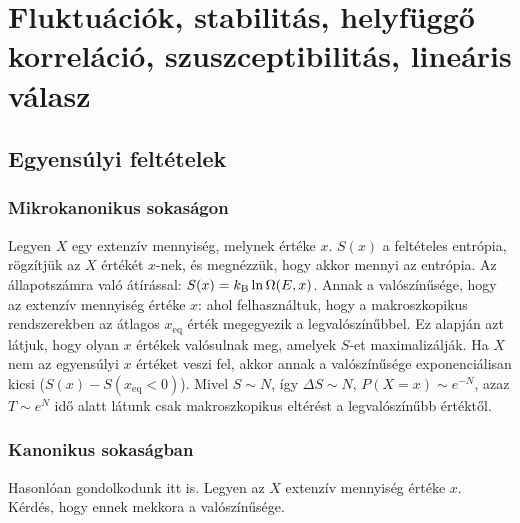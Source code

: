 \chapter{Fluktu\'aci\'ok, stabilit\'as, helyf\"ugg\H{o} korrel\'aci\'o, szuszceptibilit\'as, line\'aris v\'alasz}
 
 \section{Egyensúlyi feltételek}
  
  \subsection{Mikrokanonikus sokaságon}
   
   Legyen $X$ egy extenzív mennyiség, melynek értéke $x$. $S(x)$ a feltételes entrópia, rögzítjük az $X$ értékét $x$-nek, és megnézzük, hogy akkor mennyi az entrópia. Az állapotszámra való átírással: $S(x)=k_\text{B}\ln\Omega(E,x)$. Annak a valószínűsége, hogy az extenzív mennyiség értéke $x$:
   ahol felhasználtuk, hogy a makroszkopikus rendszerekben az átlagos $x_\text{eq}$ érték megegyezik a legvalószínűbbel. Ez alapján azt látjuk, hogy olyan $x$ értékek valósulnak meg, amelyek $S$-et maximalizálják. Ha $X$ nem az egyensúlyi $x$ értéket veszi fel, akkor annak a valószínűsége exponenciálisan kicsi ($S(x)-S(x_\text{eq}<0)$). Mivel $S\sim N$, így $\Delta S\sim N$, $P(X=x)\sim e^{-N}$, azaz $T\sim e^{N}$ idő alatt látunk csak makroszkopikus eltérést a legvalószínűbb értéktől.
   
  \subsection{Kanonikus sokaságban}
   
   Hasonlóan gondolkodunk itt is. Legyen az $X$ extenzív mennyiség értéke $x$. Kérdés, hogy ennek mekkora a valószínűsége.
   
